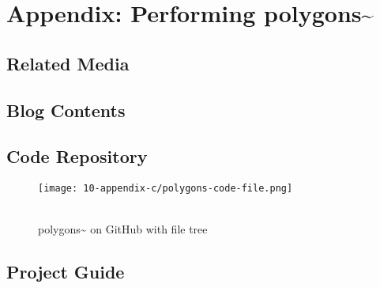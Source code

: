 \chapter{Appendix: Performing polygons\textasciitilde{}}

\section{Related Media}




\section{Blog Contents}



\section{Code Repository}
\begin{figure}[!ht]
    \texttt{[image: 10-appendix-c/polygons-code-file.png]}
    \caption*{ \\ polygons\textasciitilde{} on GitHub with file tree}
\end{figure}








\section{Project Guide}
